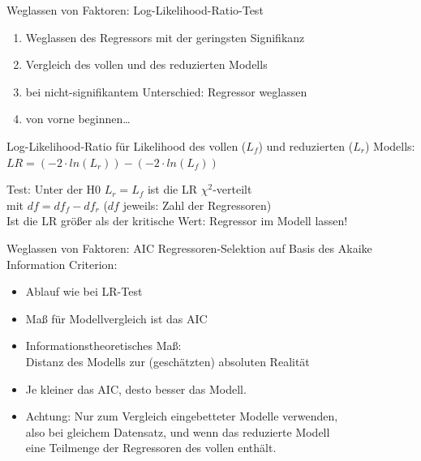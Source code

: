 \begin{frame}
  {Weglassen von Faktoren: Log-Likelihood-Ratio-Test}
  \begin{enumerate}[<+->]
    \item Weglassen des Regressors mit der geringsten Signifikanz
    \item Vergleich des vollen und des reduzierten Modells
    \item bei nicht-signifikantem Unterschied: Regressor weglassen
    \item von vorne beginnen\ldots
  \end{enumerate}
  \pause
  \begin{center}
    Log-Likelihood-Ratio für Likelihood des vollen ($L_f$) und reduzierten ($L_r$) Modells:\\
    \alert{$LR=(-2\cdot ln(L_r)) - (-2\cdot ln(L_f))$}
  \end{center}
  \pause
  \begin{center}
    Test: \alert{Unter der H0 $L_r=L_f$ ist die LR $\chi^2$-verteilt}\\
    mit $df=df_f-df_r$ ($df$ jeweils: Zahl der Regressoren)\\
    \vspace{0.25cm}
    \pause
    Ist die LR \alert{größer} als der kritische Wert: Regressor im Modell lassen!
  \end{center}
\end{frame}

\begin{frame}
  {Weglassen von Faktoren: AIC}
  Regressoren-Selektion auf Basis des \alert{Akaike Information Criterion}:
  \begin{itemize}[<+->]
    \item Ablauf wie bei LR-Test
    \item Maß für Modellvergleich ist das AIC
    \item Informationstheoretisches Maß:\\
      \alert{Distanz des Modells zur (geschätzten) absoluten Realität}
    \item Je kleiner das AIC, desto besser das Modell.
    \item Achtung: Nur zum Vergleich \alert{eingebetteter Modelle} verwenden,\\
      also bei gleichem Datensatz, und wenn das reduzierte Modell\\
      eine Teilmenge der Regressoren des vollen enthält.
  \end{itemize}
\end{frame}

